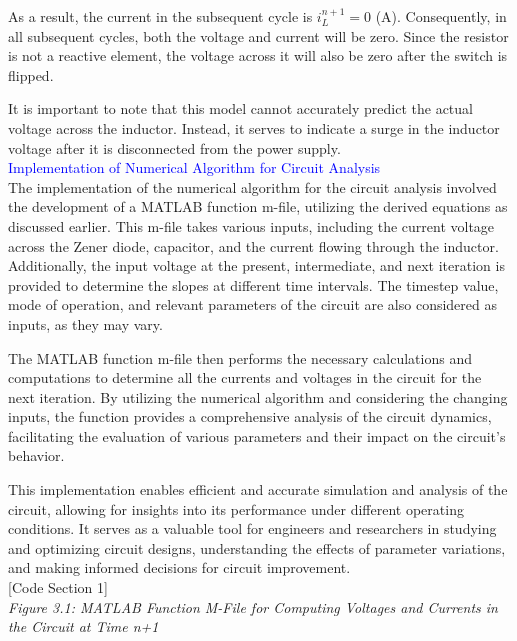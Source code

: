 As a result, the current in the subsequent cycle is $i_L^{n+1} = 0$ (A). Consequently, in all subsequent cycles, both the voltage and current will be zero. Since the resistor is not a reactive element, the voltage across it will also be zero after the switch is flipped.

It is important to note that this model cannot accurately predict the actual voltage across the inductor. Instead, it serves to indicate a surge in the inductor voltage after it is disconnected from the power supply.\\

\textcolor{blue}{Implementation of Numerical Algorithm for Circuit Analysis}\\

The implementation of the numerical algorithm for the circuit analysis involved the development of a MATLAB function m-file, utilizing the derived equations as discussed earlier. This m-file takes various inputs, including the current voltage across the Zener diode, capacitor, and the current flowing through the inductor. Additionally, the input voltage at the present, intermediate, and next iteration is provided to determine the slopes at different time intervals. The timestep value, mode of operation, and relevant parameters of the circuit are also considered as inputs, as they may vary.

The MATLAB function m-file then performs the necessary calculations and computations to determine all the currents and voltages in the circuit for the next iteration. By utilizing the numerical algorithm and considering the changing inputs, the function provides a comprehensive analysis of the circuit dynamics, facilitating the evaluation of various parameters and their impact on the circuit's behavior.

This implementation enables efficient and accurate simulation and analysis of the circuit, allowing for insights into its performance under different operating conditions. It serves as a valuable tool for engineers and researchers in studying and optimizing circuit designs, understanding the effects of parameter variations, and making informed decisions for circuit improvement.\\

[Code Section 1]\\

\emph{Figure 3.1: MATLAB Function M-File for Computing Voltages and Currents in the Circuit at Time n+1}\\


